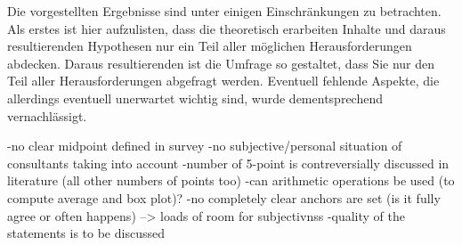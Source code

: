 \documentclass[../main.tex]{subfiles}
\begin{document}
Die vorgestellten Ergebnisse sind unter einigen Einschränkungen zu betrachten.
Als erstes ist hier aufzulisten, dass die theoretisch erarbeiten Inhalte und daraus resultierenden Hypothesen nur ein Teil aller möglichen Herausforderungen abdecken.
Daraus resultierenden ist die Umfrage so gestaltet, dass Sie nur den Teil aller Herausforderungen abgefragt werden.
Eventuell fehlende Aspekte, die allerdings eventuell unerwartet wichtig sind, wurde dementsprechend vernachlässigt.

-no clear midpoint defined in survey
-no subjective/personal situation of consultants taking into account
-number of 5-point is contreversially discussed in literature (all other numbers of points too)
-can arithmetic operations be used (to compute average and box plot)?
-no completely clear anchors are set (is it fully agree or often happens) --> loads of room for subjectivnss
-quality of the statements is to be discussed
\autocite{tanujaya2022likert}
\end{document}

